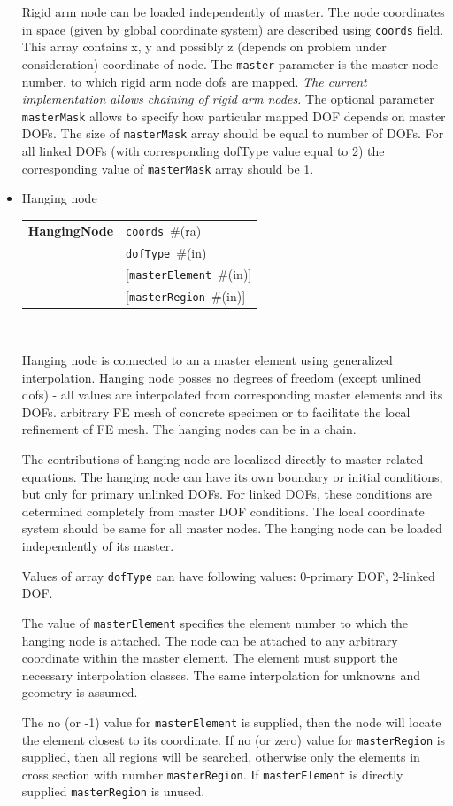 \documentclass[a4paper]{article}
\makeatletter
\newcommand{\param}[1]{\texttt{#1}} %
\newcommand{\optional}[1]{[#1]} %
\newcommand{\field}[2]{\param{#1}~\#{\tiny(#2)}} %
\newcommand{\optField}[2]{\optional{\field{#1}{#2}}}
\newcommand{\entKeywordInst}[1]{\textbf{#1}} %
\newenvironment{record}[1][]{\begin{tabular}{|ll}}{\end{tabular}\\}
\newcommand{\recentry}[2]{{#1}&{#2}\\}
\newcounter{rcc}
\newenvironment{record}[1][\textwidth]{\setcounter{rcc}{0}\begin{tabular*}{#1}{|ll@{\extracolsep{\fill}}r}}{\end{tabular*}\\}
\newcommand{\recentry}[2]{\ifthenelse{\value{rcc}>0}{&$\backslash$ \\}{\setcounter{rcc}{1}}{#1}&{#2}}
\makeatother
\begin{document}
\begin{itemize}
Rigid arm node can be loaded
independently of master. The node coordinates in space (given by
global coordinate system) are described using \param{coords}
field. This array contains x, y and possibly z (depends on problem
under consideration) coordinate of node. The \param{master} parameter is the
master node number, to which rigid arm node dofs are mapped.
{\em The current implementation allows chaining of rigid arm nodes.}
The optional parameter \param{masterMask} allows to specify how
particular mapped DOF depends on master DOFs. The size of \param{masterMask} array
should be equal to number of DOFs. For all linked DOFs (with
corresponding dofType value equal to 2) the corresponding value of
\param{masterMask} array should be 1.

\item Hanging node

\begin{record}[0.9\textwidth]
  \recentry{\entKeywordInst{HangingNode}}{\field{coords}{ra}}
  \recentry{}{\field{dofType}{in}}
  \recentry{}{\optField{masterElement}{in}}
  \recentry{}{\optField{masterRegion}{in}}
\end{record}

Hanging node is connected to an a master element using generalized interpolation.
Hanging node posses no degrees of freedom (except unlined dofs) - all values are
interpolated from corresponding master elements and its DOFs.
arbitrary FE mesh of concrete specimen or to facilitate the local
refinement of FE mesh. The hanging nodes can be in a chain.

The contributions of hanging node are localized directly to master related equations.
The hanging node can have its own boundary or initial conditions, but
only for primary unlinked DOFs. For linked DOFs, these conditions are
determined completely from master DOF conditions.
The local coordinate system should be same for all master nodes.
The hanging node can be loaded independently of its master.

Values of array \param{dofType} can have following values:
0-primary DOF, 2-linked DOF.

The value of \param{masterElement} specifies the element number to which the hanging node is attached.
The node can be attached to any arbitrary coordinate within the master element.
The element must support the necessary interpolation classes.
The same interpolation for unknowns and geometry is assumed.

The no (or -1) value for \param{masterElement} is supplied, then the node will locate the element closest to its coordinate.
If no (or zero) value for \param{masterRegion} is supplied, then all regions will be searched,
otherwise only the elements in cross section with number \param{masterRegion}.
If \param{masterElement} is directly supplied \param{masterRegion} is unused.


\end{itemize}
\end{document}
